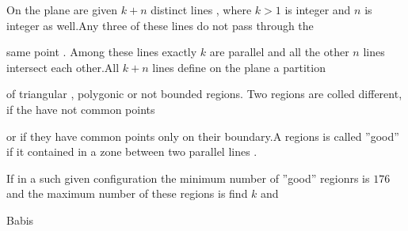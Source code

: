 On the plane are given $ k+n$  distinct lines , where $ k>1$ is integer and $ n$ is integer as well.Any three of these lines do not pass through the

same point . Among these lines exactly  $ k$ are parallel and all the other $ n$ lines intersect each other.All $ k+n$ lines define on the plane a partition

of triangular , polygonic or not bounded regions. Two regions are colled different, if the have not common points

or if they have common points only on their boundary.A regions is called ''good'' if it contained in a zone between two parallel lines .

If in a such given configuration the minimum number of ''good'' regionrs is $ 176$ and the maximum number of these regions is  find $ k$ and 


Babis